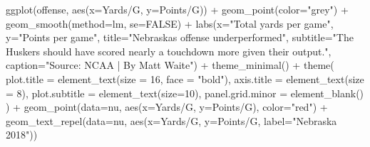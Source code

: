 \documentclass[
]{book}
\newenvironment{Shaded}{\begin{snugshade}}{\end{snugshade}}
\newcommand{\AttributeTok}[1]{\textcolor[rgb]{0.77,0.63,0.00}{#1}}
\newcommand{\ConstantTok}[1]{\textcolor[rgb]{0.00,0.00,0.00}{#1}}
\newcommand{\DecValTok}[1]{\textcolor[rgb]{0.00,0.00,0.81}{#1}}
\newcommand{\FunctionTok}[1]{\textcolor[rgb]{0.00,0.00,0.00}{#1}}
\newcommand{\NormalTok}[1]{#1}
\newcommand{\SpecialCharTok}[1]{\textcolor[rgb]{0.00,0.00,0.00}{#1}}
\newcommand{\StringTok}[1]{\textcolor[rgb]{0.31,0.60,0.02}{#1}}
\begin{document}
\begin{Shaded}
\begin{Highlighting}[]
\FunctionTok{ggplot}\NormalTok{(offense, }\FunctionTok{aes}\NormalTok{(}\AttributeTok{x=}\StringTok{\textasciigrave{}}\AttributeTok{Yards/G}\StringTok{\textasciigrave{}}\NormalTok{, }\AttributeTok{y=}\StringTok{\textasciigrave{}}\AttributeTok{Points/G}\StringTok{\textasciigrave{}}\NormalTok{)) }\SpecialCharTok{+} 
  \FunctionTok{geom\_point}\NormalTok{(}\AttributeTok{color=}\StringTok{"grey"}\NormalTok{) }\SpecialCharTok{+} \FunctionTok{geom\_smooth}\NormalTok{(}\AttributeTok{method=}\NormalTok{lm, }\AttributeTok{se=}\ConstantTok{FALSE}\NormalTok{) }\SpecialCharTok{+} 
  \FunctionTok{labs}\NormalTok{(}\AttributeTok{x=}\StringTok{"Total yards per game"}\NormalTok{, }\AttributeTok{y=}\StringTok{"Points per game"}\NormalTok{, }\AttributeTok{title=}\StringTok{"Nebraska\textquotesingle{}s offense underperformed"}\NormalTok{, }\AttributeTok{subtitle=}\StringTok{"The Husker\textquotesingle{}s should have scored nearly a touchdown more given their output."}\NormalTok{, }\AttributeTok{caption=}\StringTok{"Source: NCAA | By Matt Waite"}\NormalTok{) }\SpecialCharTok{+} 
  \FunctionTok{theme\_minimal}\NormalTok{() }\SpecialCharTok{+} 
  \FunctionTok{theme}\NormalTok{(}
    \AttributeTok{plot.title =} \FunctionTok{element\_text}\NormalTok{(}\AttributeTok{size =} \DecValTok{16}\NormalTok{, }\AttributeTok{face =} \StringTok{"bold"}\NormalTok{),}
    \AttributeTok{axis.title =} \FunctionTok{element\_text}\NormalTok{(}\AttributeTok{size =} \DecValTok{8}\NormalTok{), }
    \AttributeTok{plot.subtitle =} \FunctionTok{element\_text}\NormalTok{(}\AttributeTok{size=}\DecValTok{10}\NormalTok{), }
    \AttributeTok{panel.grid.minor =} \FunctionTok{element\_blank}\NormalTok{()}
\NormalTok{    ) }\SpecialCharTok{+}
  \FunctionTok{geom\_point}\NormalTok{(}\AttributeTok{data=}\NormalTok{nu, }\FunctionTok{aes}\NormalTok{(}\AttributeTok{x=}\StringTok{\textasciigrave{}}\AttributeTok{Yards/G}\StringTok{\textasciigrave{}}\NormalTok{, }\AttributeTok{y=}\StringTok{\textasciigrave{}}\AttributeTok{Points/G}\StringTok{\textasciigrave{}}\NormalTok{), }\AttributeTok{color=}\StringTok{"red"}\NormalTok{) }\SpecialCharTok{+} 
  \FunctionTok{geom\_text\_repel}\NormalTok{(}\AttributeTok{data=}\NormalTok{nu, }\FunctionTok{aes}\NormalTok{(}\AttributeTok{x=}\StringTok{\textasciigrave{}}\AttributeTok{Yards/G}\StringTok{\textasciigrave{}}\NormalTok{, }\AttributeTok{y=}\StringTok{\textasciigrave{}}\AttributeTok{Points/G}\StringTok{\textasciigrave{}}\NormalTok{, }\AttributeTok{label=}\StringTok{"Nebraska 2018"}\NormalTok{))}
\end{Highlighting}
\end{Shaded}
\end{document}

